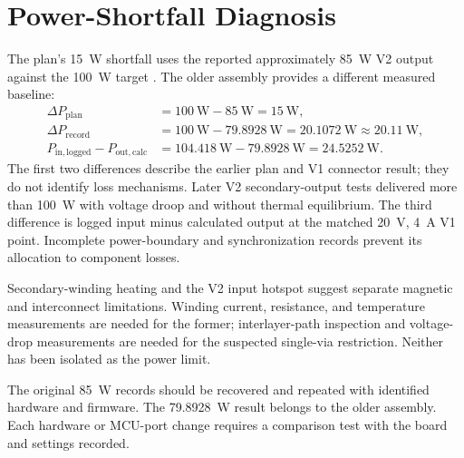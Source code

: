 \section{Power-Shortfall Diagnosis}
\label{sec:disc-plan-gap}

The plan's \SI{15}{\watt} shortfall uses the reported approximately
\SI{85}{\watt} V2 output against the \SI{100}{\watt} target
\cite{projectOctoberPlan}. The older assembly provides a different
measured baseline:
\begin{align*}
\Delta P_{\mathrm{plan}} & = \SI{100}{\watt}-\SI{85}{\watt}
  = \SI{15}{\watt},\\
\Delta P_{\mathrm{record}} & = \SI{100}{\watt}-\SI{79.8928}{\watt}
  = \SI{20.1072}{\watt}\approx\SI{20.11}{\watt},\\
P_{\mathrm{in,logged}}-P_{\mathrm{out,calc}} & =
  \SI{104.418}{\watt}-\SI{79.8928}{\watt}
  = \SI{24.5252}{\watt}.
\end{align*}
The first two differences describe the earlier plan and V1 connector result; they do not identify loss mechanisms. Later V2 secondary-output tests delivered more than \SI{100}{\watt} with voltage droop and without thermal equilibrium. The third difference is logged input minus calculated output at the matched \SI{20}{\volt}, \SI{4}{\ampere} V1 point. Incomplete power-boundary and synchronization records prevent its allocation to component losses.

Secondary-winding heating and the V2 input hotspot suggest separate
magnetic and interconnect limitations. Winding current, resistance, and
temperature measurements are needed for the former; interlayer-path
inspection and voltage-drop measurements are needed for the suspected
single-via restriction. Neither has been isolated as the power limit.

The original \SI{85}{\watt} records should be recovered and repeated
with identified hardware and firmware. The \SI{79.8928}{\watt} result
belongs to the older assembly. Each hardware or MCU-port change requires
a comparison test with the board and settings recorded.

